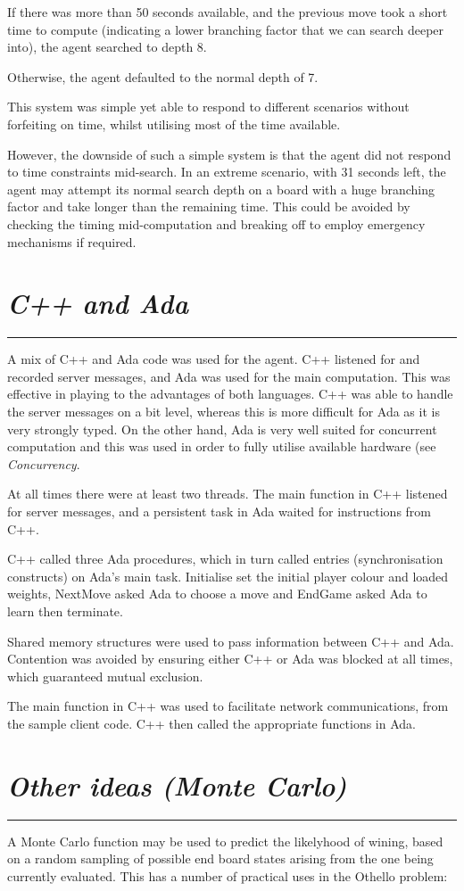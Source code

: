\documentclass[10pt]{report}
\begin{document}
\begin{multicols}{2}
If there was more than 50 seconds available, and the previous move took a short time to compute (indicating a lower branching factor that we can search deeper into), the agent searched to depth 8.

Otherwise, the agent defaulted to the normal depth of 7.

This system was simple yet able to respond to different scenarios without forfeiting on time, whilst utilising most of the time available.

However, the downside of such a simple system is that the agent did not respond to time constraints mid-search. In an extreme scenario, with 31 seconds left, the agent may attempt its normal search depth on a board with a huge branching factor and take longer than the remaining time. This could be avoided by checking the timing mid-computation and breaking off to employ emergency mechanisms if required.
\section*{\emph{C++ and Ada}}
\hrule
A mix of C++ and Ada code was used for the agent. C++ listened for and recorded server messages, and Ada was used for the main computation. This was effective in playing to the advantages of both languages. C++ was able to handle the server messages on a bit level, whereas this is more difficult for Ada as it is very strongly typed. On the other hand, Ada is very well suited for concurrent computation and this was used in order to fully utilise available hardware (see \emph{Concurrency}.

At all times there were at least two threads. The main function in C++ listened for server messages, and a persistent task in Ada waited for instructions from C++.

C++ called three Ada procedures, which in turn called entries (synchronisation constructs) on Ada's main task. Initialise set the initial player colour and loaded weights, NextMove asked Ada to choose a move and EndGame asked Ada to learn then terminate.

Shared memory structures were used to pass information between C++ and Ada. Contention was avoided by ensuring either C++ or Ada was blocked at all times, which guaranteed mutual exclusion.

The main function in C++ was used to facilitate network communications, from the sample client code. C++ then called the appropriate functions in Ada.

\section*{\emph{Other ideas (Monte Carlo)}}
\hrule
A Monte Carlo function may be used to predict the likelyhood of wining, based on a random sampling of possible end board states arising from the one being currently evaluated. This has a number of practical uses in the Othello problem:


\end{multicols}
\end{document}
